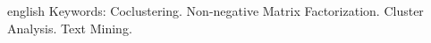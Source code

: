 \documentclass[
    12pt,                %
    oneside,            %
    a4paper,            %
    english,            %
    brazil                %
    ]{abntex2ppgsi}
\begin{document}
\begin{resumo}[Abstract]
\begin{otherlanguage*}{english}
Keywords: Coclustering. Non-negative Matrix Factorization. Cluster Analysis. Text Mining.
\end{otherlanguage*}
\end{resumo}

\listoffigures*
\cleardoublepage

\listofalgorithms
\cleardoublepage

\listoftables*
\cleardoublepage

%
%
\end{document}
